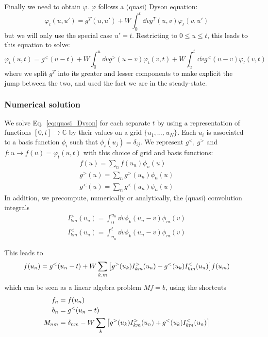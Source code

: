 \documentclass[12pt]{article}
\begin{document}
Finally we need to obtain $\varphi$. 
$\varphi$ follows a (quasi) Dyson equation:
\begin{equation}
	\varphi_t(u, u') = g^T(u, u') + W \int_0^t \dd{v} g^T(u, v) \varphi_t(v, u')
\end{equation}
but we will only use the special case $u' = t$. Restricting to $0 \le u \le t$, this leads to this equation to solve:
\begin{equation}
	\label{eq:quasi_Dyson}
	\varphi_t(u, t) = g^<(u - t) + W \int_0^u \dd{v} g^>(u - v) \varphi_t(v, t) + W \int_u^t \dd{v} g^<(u - v) \varphi_t(v, t)
\end{equation}
where we split $g^T$ into its greater and lesser components to make explicit the jump between the two, and used the fact we are in the steady-state.

\subsubsection{Numerical solution}

We solve Eq.~\eqref{eq:quasi_Dyson} for each separate $t$ by using a representation of functions $[0, t] \rightarrow \mathbb{C}$ by their values on a grid $\{u_1, \ldots, u_N\}$. Each $u_i$ is associated to a basis function $\phi_i$ such that $\phi_i(u_j) = \delta_{ij}$. We represent $g^<$, $g^>$ and $f:u \rightarrow f(u) = \varphi_t(u, t)$ with this choice of grid and basis functions:
\begin{gather}
	f(u) = \sum_n f(u_n) \phi_n(u)
	\\
	g^>(u) = \sum_n g^>(u_n) \phi_n(u)
	\\
	g^<(u) = \sum_n g^<(u_n) \phi_n(u)
\end{gather}
In addition, we precompute, numerically or analytically, the (quasi) convolution integrals
\begin{gather}
	I^>_{km}(u_n) = \int_0^{u_n} \dd{v} \phi_k(u_n - v) \phi_m(v)
	\\
	I^<_{km}(u_n) = \int_{u_n}^t \dd{v} \phi_k(u_n - v) \phi_m(v)
\end{gather}

This leads to
\begin{equation}
	f(u_n) = g^<(u_n - t) + W \sum_{k,m} \qty[g^>(u_k) I^>_{km}(u_n) + g^<(u_k) I^<_{km}(u_n)] f(u_m)
\end{equation}
which can be seen as a linear algebra problem $M f = b$, using the shortcuts
\begin{align}
	f_n ={}& f(u_n)
	\\
	b_n ={}& g^<(u_n - t)
	\\
	M_{nm} ={}& \delta_{nm} - W \sum_k \qty[g^>(u_k) I^>_{km}(u_n) + g^<(u_k) I^<_{km}(u_n)]
\end{align}
\end{document}
